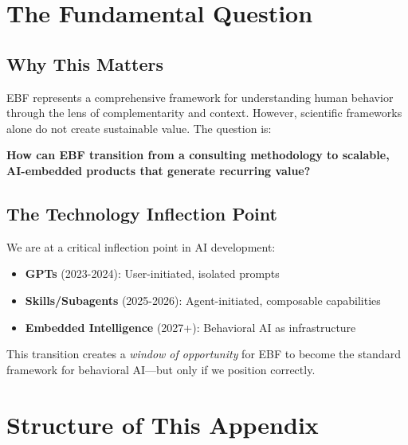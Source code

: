 \section{The Fundamental Question}
\label{sec:vvv-fundamental}

\subsection{Why This Matters}

EBF represents a comprehensive framework for understanding human behavior through the lens of complementarity and context. However, scientific frameworks alone do not create sustainable value. The question is:

\begin{tcolorbox}[colback=red!5!white, colframe=red!75!black,
    title=The Fundamental Question]
\textbf{How can EBF transition from a consulting methodology to scalable, AI-embedded products that generate recurring value?}
\end{tcolorbox}

\subsection{The Technology Inflection Point}

We are at a critical inflection point in AI development:

\begin{itemize}
\item \textbf{GPTs} (2023-2024): User-initiated, isolated prompts
\item \textbf{Skills/Subagents} (2025-2026): Agent-initiated, composable capabilities
\item \textbf{Embedded Intelligence} (2027+): Behavioral AI as infrastructure
\end{itemize}

This transition creates a \textit{window of opportunity} for EBF to become the standard framework for behavioral AI---but only if we position correctly.


\section{Structure of This Appendix}
\label{sec:vvv-structure}

